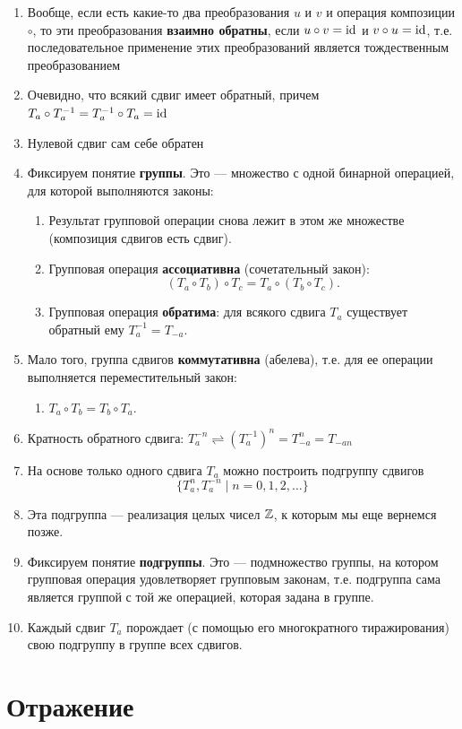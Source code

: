 \begin{enumerate}
\item Вообще, если есть какие-то два преобразования $u$ и $v$ и операция композиции $\circ$, то эти преобразования \textbf{взаимно обратны}, если $u\circ v=\mathrm{id}$ и $v\circ u=\mathrm{id}$, т.е. последовательное применение этих преобразований является тождественным преобразованием
\item Очевидно, что всякий сдвиг имеет обратный, причем $T_a\circ T_a^{-1}=T_a^{-1}\circ T_a=\mathrm{id}$
\item Нулевой сдвиг сам себе обратен
\item Фиксируем понятие \textbf{группы}. Это --- множество с одной бинарной операцией, для которой выполняются законы:
\begin{enumerate}[G1]
\item Результат групповой операции снова лежит в этом же множестве (композиция сдвигов есть сдвиг).
\item Групповая операция \textbf{ассоциативна} (сочетательный закон):
$$
(T_a\circ T_b)\circ T_c=T_a\circ(T_b\circ T_c).
$$
\item Групповая операция \textbf{обратима}: для всякого сдвига $T_a$ существует обратный ему $T_{a}^{-1}=T_{-a}$.
\end{enumerate}
\item Мало того, группа сдвигов \textbf{коммутативна} (абелева), т.е. для ее операции выполняется переместительный закон:
\begin{enumerate}[resume*]
\item $T_a\circ T_b=T_b\circ T_a.$
\end{enumerate}
\item Кратность обратного сдвига: $T_a^{-n}\rightleftharpoons (T_a^{-1})^n=T_{-a}^n=T_{-an}$
\item На основе только одного сдвига $T_a$ можно построить подгруппу сдвигов $$\{T_a^n, T_a^{-n}\;|\; n=0,1,2,\dots\}$$
\item Эта подгруппа --- реализация целых чисел $\mathbb Z$, к которым мы еще вернемся позже.
\item Фиксируем понятие \textbf{подгруппы}. Это --- подмножество группы, на котором групповая операция удовлетворяет групповым законам, т.е. подгруппа сама является группой с той же операцией, которая задана в группе.
\item Каждый сдвиг $T_a$ порождает (с помощью его многократного тиражирования) свою подгруппу в группе всех сдвигов.
\end{enumerate}



\section{Отражение}

